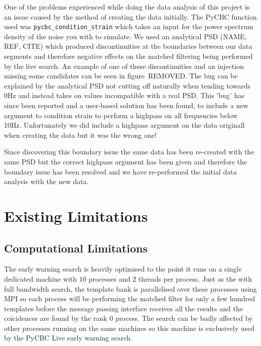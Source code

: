 One of the problems experienced while doing the data analysis of this project is an issue caused by the method of creating the data initially. The PyCBC function used was \verb|pycbc_condition_strain| which takes an input for the power spectrum density of the noise you with to simulate. We used an analytical PSD (NAME, REF, CITE) which produced discontinuities at the boundaries between our data segments and therefore negative effects on the matched filtering being performed by the live search. An example of one of these discontinuities and an injection missing some candidates can be seen in figure~REMOVED.
The bug can be explained by the analytical PSD not cutting off naturally when tending towards 0Hz and instead takes on values incompatible with a real PSD. This 'bug' has since been reported and a user-based solution has been found, to include a new argument to condition strain to perform a highpass on all frequencies below 10Hz. Unfortunately we did include a highpass argument on the data originall when creating the data but it was the wrong one!

Since discovering this boundary issue the same data has been re-created with the same PSD but the correct highpass argument has been given and therefore the boundary issue has been resolved and we have re-performed the initial data analysis with the new data.


\section{Existing Limitations}

\subsection{Computational Limitations}

The early warning search is heavily optimised to the point it runs on a single dedicated machine with $10$ processes and $2$ threads per process. Just as the with full bandwidth search, the template bank is parallelised over these processes using MPI so each process will be performing the matched filter for only a few hundred templates before the message passing interface receives all the results and the coicidences are found by the rank 0 process. The search can be badly affected by other processes running on the same machines so this machine is exclusively used by the PyCBC Live early warning search.


